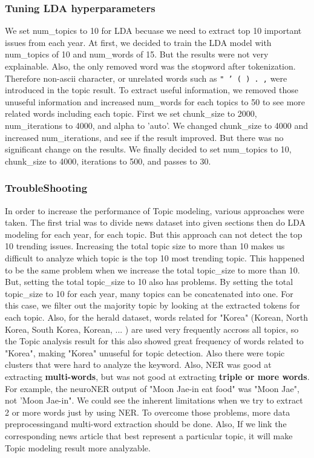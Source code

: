 \subsubsection{Tuning LDA hyperparameters}
We set num\_topics to 10 for LDA becuase we need to extract top 10 important issues from each year. At first, we decided to train the LDA model with num\_topics of 10 and num\_words of 15. But the results were not very explainable. Also, the only removed word was the stopword after tokenization. Therefore non-ascii character, or unrelated words such as
\texttt{" \xec ' ( ) . ,} were introduced in the topic result. To extract useful information, we removed those unuseful information and increased num\_words for each topics to 50 to see more related words including each topic. First we set chunk\_size to 2000, num\_iterations to 4000, and alpha to 'auto'. We changed chunk\_size to 4000 and increased num\_iterations, and see if the result improved. But there was no significant change on the results. We finally decided to set num\_topics to 10, chunk\_size to 4000, iterations to 500, and passes to 30.

\subsubsection{TroubleShooting}
In order to increase the performance of Topic modeling, various approaches were taken. The first trial was to divide news dataset into given sections then do LDA modeling for each year, for each topic. But this approach can not detect the top 10 trending issues. Increasing the total topic size to more than 10 makes us difficult to analyze which topic is the top 10 most trending topic. This happened to be the same problem when we increase the total topic\_size to more than 10.
But, setting the total topic\_size to 10 also has problems. By setting the total topic\_size to 10 for each year, many topics can be concatenated into one. For this case, we filter out the majority topic by looking at the extracted tokens for each topic. Also, for the herald dataset, words related for "Korea" (Korean, North Korea, South Korea, Korean, ... ) are used very frequently accross all topics, so the Topic analysis result for this also showed great frequency of words related to "Korea", making "Korea" unuseful for topic detection. Also there were topic clusters that were hard to analyze the keyword. Also, NER was good at extracting \textbf{multi-words}, but was not good at extracting \textbf{triple or more words}. For example, the neuroNER output of "Moon Jae-in eat food" was "Moon Jae", not 'Moon Jae-in". We could see the inherent limitations when we try to extract 2 or more words just by using NER. To overcome those problems, more data preprocessingand multi-word extraction should be done. Also, If we link the corresponding news article that best represent a particular topic, it will make Topic modeling result more analyzable.

